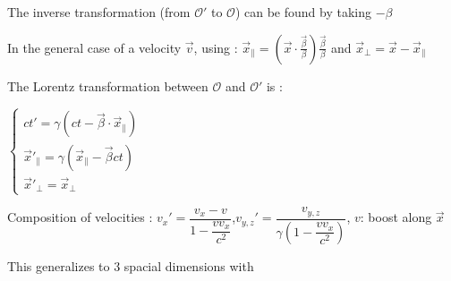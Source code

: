 \begin{squishlist}
\item The inverse transformation (from $\mathcal{O}'$ to $\mathcal{O}$) can be found by taking $-\beta$

\item In the general case of a velocity $\vec{v}$, using : $\vec{x}_{\parallel} = \left( \vec{x} \cdot \frac{\vec{\beta}}{\beta} \right) \frac{\vec{\beta}}{\beta}$ and  $\vec{x}_{\perp} = \vec{x} - \vec{x}_{\parallel}$


\item The Lorentz transformation between $\mathcal{O}$ and $\mathcal{O}'$ is : 
\item $\begin{cases}
ct' = \gamma(ct- \vec{\beta} \cdot \vec{x}_\parallel) \\
\vec{x}'_{\parallel} = \gamma(\vec{x}_\parallel- \vec{\beta} c t)\\
\vec{x}'_{\perp} = \vec{x}_\perp
\end{cases}$
	
\item Composition of velocities : %
$v_x' = \dfrac{v_x - v}{1 - \dfrac{v v_x}{c^2}}$,\quad $v_{y,z}' = \dfrac{v_{y,z}}{\gamma(1 - \dfrac{v v_x}{c^2})}$, $v$: boost along $\vec{x}$
\end{squishlist}
This generalizes to 3 spacial dimensions with
